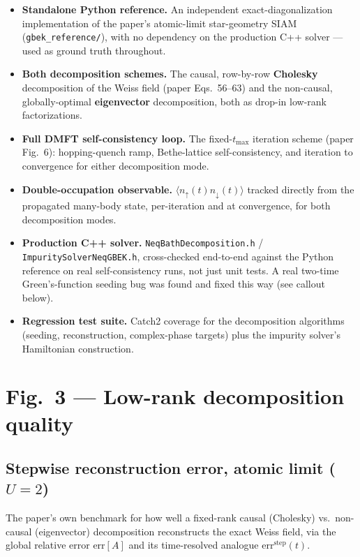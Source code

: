 \documentclass[11pt]{article}
\begin{document}
\begin{itemize}
  \item \textbf{Standalone Python reference.} An independent
    exact-diagonalization implementation of the paper's atomic-limit
    star-geometry SIAM (\texttt{gbek\_reference/}), with no dependency on
    the production C++ solver --- used as ground truth throughout.
  \item \textbf{Both decomposition schemes.} The causal, row-by-row
    \textbf{Cholesky} decomposition of the Weiss field (paper Eqs.\
    56--63) and the non-causal, globally-optimal \textbf{eigenvector}
    decomposition, both as drop-in low-rank factorizations.
  \item \textbf{Full DMFT self-consistency loop.} The fixed-$t_\text{max}$
    iteration scheme (paper Fig.\ 6): hopping-quench ramp, Bethe-lattice
    self-consistency, and iteration to convergence for either
    decomposition mode.
  \item \textbf{Double-occupation observable.} $\langle n_\uparrow(t)
    n_\downarrow(t)\rangle$ tracked directly from the propagated
    many-body state, per-iteration and at convergence, for both
    decomposition modes.
  \item \textbf{Production C++ solver.} \texttt{NeqBathDecomposition.h} /
    \texttt{ImpuritySolverNeqGBEK.h}, cross-checked end-to-end against the
    Python reference on real self-consistency runs, not just unit tests.
    A real two-time Green's-function seeding bug was found and fixed this
    way (see callout below).
  \item \textbf{Regression test suite.} Catch2 coverage for the
    decomposition algorithms (seeding, reconstruction, complex-phase
    targets) plus the impurity solver's Hamiltonian construction.
\end{itemize}

\section{Fig.\ 3 --- Low-rank decomposition quality}
\subsection*{Stepwise reconstruction error, atomic limit ($U=2$)}
The paper's own benchmark for how well a fixed-rank causal (Cholesky) vs.\
non-causal (eigenvector) decomposition reconstructs the exact Weiss field,
via the global relative error $\mathrm{err}[A]$ and its time-resolved
analogue $\mathrm{err}^\mathrm{step}(t)$.
\end{document}
